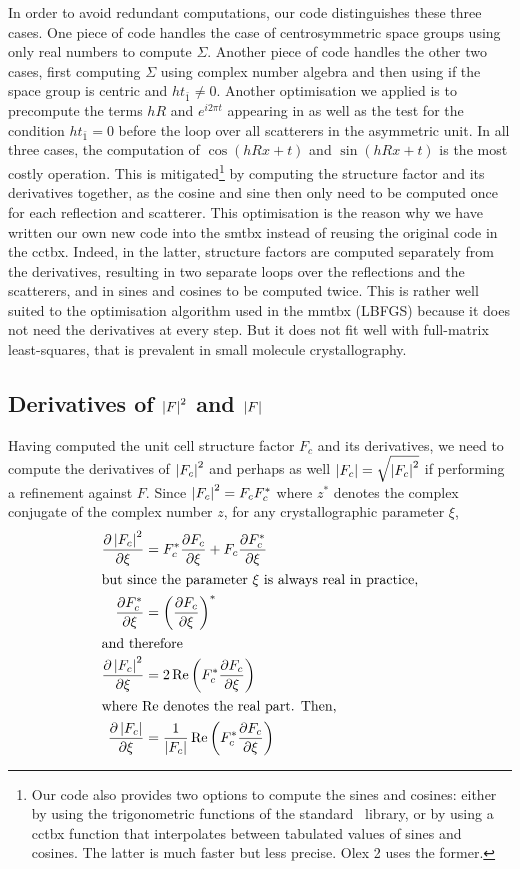 \documentclass[pdf]{iucr}
\begin{document}
In order to avoid redundant computations, our code distinguishes these three cases. One piece of code handles the case of centrosymmetric space groups using only real numbers to compute $\Sigma$. Another piece of code handles the other two cases, first computing $\Sigma$ using complex number algebra and then using  if the space group is centric and $h t_{\bar{1}} \neq 0$. Another optimisation we applied is to precompute the terms $hR$ and $e^{i2\pi t}$ appearing in  as well as the test for the condition $h t_{\bar{1}}=0$ before the loop over all scatterers in the asymmetric unit. In all three cases, the computation of $\cos(hRx + t)$ and $\sin(hRx + t)$ is the most costly operation. This is mitigated\footnote{Our code also provides two options to compute the sines and cosines: either by using the trigonometric functions of the standard \cpp\ library, or by using a cctbx function that interpolates between tabulated values of sines and cosines. The latter is much faster but less precise. Olex 2 uses the former.} by computing the structure factor and its derivatives together, as the cosine and sine then only need to be computed once for each reflection and scatterer.
This optimisation is the reason why we have written our own new code into the smtbx instead of reusing the original code in the cctbx. Indeed, in the latter, structure factors are computed separately from the derivatives, resulting in two separate loops over the reflections and the scatterers, and in sines and cosines to be computed twice. This is rather well suited to the optimisation algorithm used in the mmtbx (LBFGS) because it does not need the derivatives at every step. But it does not fit well with full-matrix least-squares, that is prevalent in small molecule crystallography.  

\subsection{Derivatives of $\left| F \right|^2$ and $\left| F \right|$}

Having computed the unit cell structure factor $F_c$ and its derivatives, we need to compute the derivatives of $\left| F_c \right|^2$ and perhaps as well $\left| F_c \right| = \sqrt{\left| F_c \right|^2}$ if performing a refinement against $F$. Since $\left| F_c \right|^2 = F_c F_c^*$ where $z^*$ denotes the complex conjugate of the complex number $z$, for any crystallographic parameter $\xi$,
\begin{align}
\frac{\partial \left| F_c \right|^2}{\partial \xi} &= F_c^* \frac{\partial F_c}{\partial \xi} + F_c \frac{\partial F_c^*}{\partial \xi} \nonumber \\
\intertext{but since the parameter $\xi$ is always real in practice,}
\frac{\partial F_c^*}{\partial \xi} &= \left( \frac{\partial F_c}{\partial \xi} \right)^* \\
\intertext{and therefore}
\frac{\partial \left| F_c \right|^2}{\partial \xi} &= 2\operatorname{Re}\left( F_c^* \frac{\partial F_c}{\partial \xi}\right) \\
\intertext{where $\operatorname{Re}$ denotes the real part. Then,}
\frac{\partial \left| F_c \right|}{\partial \xi} &= \frac{1}{\left| F_c \right|} \operatorname{Re}\left( F_c^* \frac{\partial F_c}{\partial \xi}\right)
\end{align}
\end{document}
